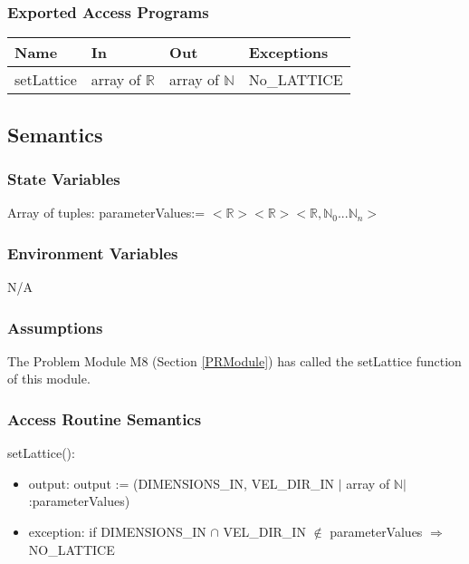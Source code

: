 \documentclass[12pt, titlepage]{article}
\begin{document}
\subsubsection{Exported Access Programs}

\begin{center}
	\begin{tabular}{p{2cm} p{4cm} p{4cm} p{2cm}}
		\hline
		\textbf{Name} & \textbf{In} & \textbf{Out} & \textbf{Exceptions} \\
		\hline
		setLattice & array of $\mathbb{R}$ & array of $\mathbb{N}$ & No\_LATTICE \\
		\hline
	\end{tabular}
\end{center}

\subsection{Semantics}

\subsubsection{State Variables}

Array of tuples: parameterValues:= $<$$\mathbb{R}$$>$$<$$\mathbb{R}$$>$$<$$\mathbb{R},\mathbb{N}_0$...$\mathbb{N}_n$$>$ 

\subsubsection{Environment Variables}
N/A

\subsubsection{Assumptions}

The Problem Module M8 (Section \ref{PRModule}) has called the setLattice function of this module.

\subsubsection{Access Routine Semantics}

\noindent setLattice():
\begin{itemize}
	\item output: output := (DIMENSIONS\_IN, VEL\_DIR\_IN $|$ array of $\mathbb{N}$$|$:parameterValues)
	\item exception: if DIMENSIONS\_IN $\cap$ VEL\_DIR\_IN $\notin$ parameterValues $\Rightarrow$ NO\_LATTICE
\end{itemize}
\end{document}
